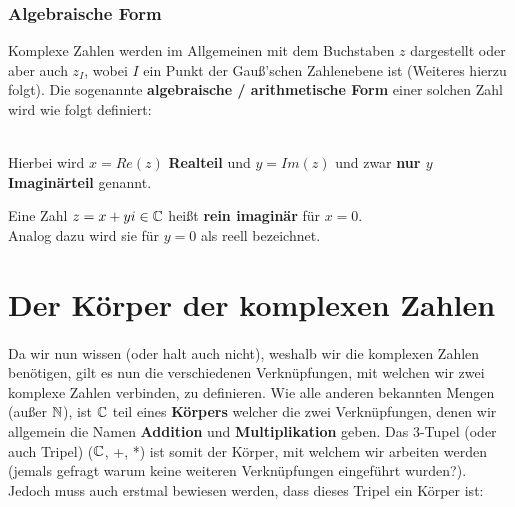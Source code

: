 \documentclass[main.tex]{subfiles}
\begin{document}
	\subsubsection{Algebraische Form}

	\begin{Definition}
		Komplexe Zahlen werden im Allgemeinen mit dem Buchstaben $z$ dargestellt oder aber auch $z_I$, wobei $I$ ein Punkt der Gauß'schen Zahlenebene ist (Weiteres hierzu folgt). Die sogenannte \textbf{algebraische / arithmetische Form} einer solchen Zahl wird wie folgt definiert:
		\\
		\\
		Hierbei wird $x = Re(z)$ \textbf{Realteil} und $y = Im(z)$ und zwar \textbf{nur $y$ Imaginärteil} genannt.
	\end{Definition}

	\begin{Bemerkung}
		Eine Zahl $z = x + yi \in \mathbb{C}$ heißt \textbf{rein imaginär} für $x = 0$.
		\\
		Analog dazu wird sie für $y = 0$ als reell bezeichnet.
	\end{Bemerkung}


\section{Der Körper der komplexen Zahlen}

	\paragraph{} Da wir nun wissen (oder halt auch nicht), weshalb wir die komplexen Zahlen benötigen, gilt es nun die verschiedenen Verknüpfungen, mit welchen wir zwei komplexe Zahlen verbinden, zu definieren. Wie alle anderen bekannten Mengen (außer $\mathbb{N}$), ist $\mathbb{C}$ teil eines \textbf{Körpers} welcher die zwei Verknüpfungen, denen wir allgemein die Namen \textbf{Addition} und \textbf{Multiplikation} geben. Das 3-Tupel (oder auch Tripel) ($\mathbb{C}$, +, *) ist somit der Körper, mit welchem wir arbeiten werden (jemals gefragt warum keine weiteren Verknüpfungen eingeführt wurden?). Jedoch muss auch erstmal bewiesen werden, dass dieses Tripel ein Körper ist:
\end{document}
